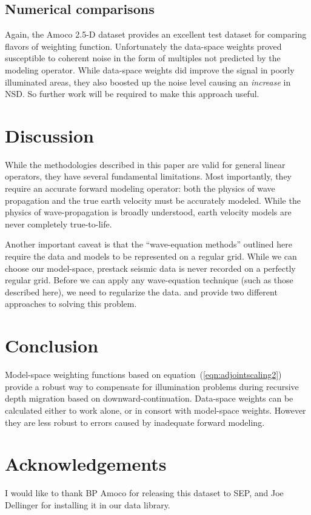\subsection{Numerical comparisons}
Again, the Amoco 2.5-D dataset provides an excellent test dataset for
comparing flavors of weighting function.
Unfortunately the data-space weights proved susceptible to coherent
noise in the form of multiples not predicted by the modeling
operator.  While data-space weights did improve the signal in poorly
illuminated areas, they also boosted up the noise level causing an
{\em increase} in NSD. So further work will be required to make this
approach useful.

\section{Discussion}
While the methodologies described in this paper are valid for general 
linear operators, they have several fundamental limitations. Most
importantly, they require an accurate forward modeling operator: both
the physics of wave propagation and the true earth velocity must be
accurately modeled. 
While the physics of wave-propagation is broadly understood, earth 
velocity models are never completely true-to-life.

\par
Another important caveat is that the ``wave-equation methods''
outlined here require the data and models to be represented on a
regular grid.  
While we can choose our model-space, prestack seismic data is never 
recorded on a perfectly regular grid.  Before we can apply any
wave-equation technique (such as those described here), we need to
regularize the data.  
 and  provide two 
different approaches to solving this problem.

\section{Conclusion}
Model-space weighting functions based on
equation~(\ref{eqn:adjointscaling2}) provide a robust way to
compensate for illumination problems during recursive depth migration
based on downward-continuation. 
Data-space weights can be calculated either to work alone, or in
consort with model-space weights. 
However they are less robust to errors caused by inadequate forward
modeling. 

\section{Acknowledgements}
I would like to thank BP Amoco for releasing this dataset to SEP, and
Joe Dellinger for installing it in our data library.












